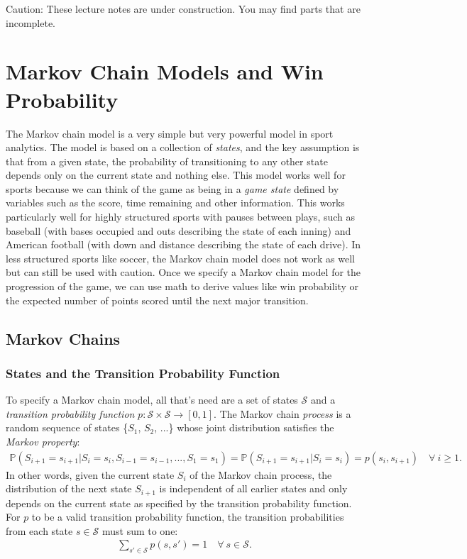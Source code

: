 \documentclass{article}
\begin{document}
  \begin{framed}
    {\sc Caution:} These lecture notes are under construction. You may find parts that are incomplete.
  \end{framed}

  \setcounter{section}{5}
  \section{\sc Markov Chain Models and Win Probability}

  The Markov chain model is a very simple but very powerful model in sport analytics. The model is based on a collection of {\it states}, and the key assumption is that from a given state, the probability of transitioning to any other state depends only on the current state and nothing else. This model works well for sports because we can think of the game as being in a {\it game state} defined by variables such as the score, time remaining and other information. This works particularly well for highly structured sports with pauses between plays, such as baseball (with bases occupied and outs describing the state of each inning) and American football (with down and distance describing the state of each drive). In less structured sports like soccer, the Markov chain model does not work as well but can still be used with caution. Once we specify a Markov chain model for the progression of the game, we can use math to derive values like win probability or the expected number of points scored until the next major transition.

  \subsection{\sc Markov Chains}
  \label{sec:markov-chains}

    \subsubsection{\sc States and the Transition Probability Function}

    To specify a Markov chain model, all that's need are a set of states $\mathcal S$ and a {\it transition probability function} $p : \mathcal S \times \mathcal S \rightarrow [0, 1]$. The Markov chain {\it process} is a random sequence of states \{$S_1$, $S_2$, ...\} whose joint distribution satisfies the {\it Markov property}:
    \begin{align*}
      \mathbb{P}(S_{i+1} = s_{i+1} | S_i = s_i, S_{i - 1} = s_{i - 1}, ..., S_1 = s_1) = \mathbb{P}(S_{i+1} = s_{i+1} | S_i = s_i) = p(s_i, s_{i+1}) \quad \forall~i \ge 1.
    \end{align*}
    In other words, given the current state $S_i$ of the Markov chain process, the distribution of the next state $S_{i+1}$ is independent of all earlier states and only depends on the current state as specified by the transition probability function. For $p$ to be a valid transition probability function, the transition probabilities from each state $s \in \mathcal S$ must sum to one:
    \begin{align*}
      \sum_{s' \in \mathcal S} p(s, s') = 1 \quad \forall~s \in \mathcal S.
    \end{align*}
\end{document}
